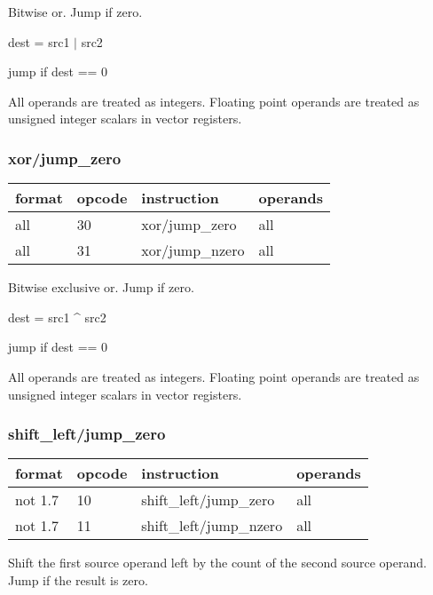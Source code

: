 \documentclass[forwardcom.tex]{subfiles}
\begin{document}
Bitwise or. Jump if zero.
\vspace{2mm}

dest = src1 $|$ src2

jump if dest == 0
\vspace{2mm}

All operands are treated as integers. 
Floating point operands are treated as unsigned integer scalars in vector registers.
\vspace{2mm}

\subsubsection{xor/jump\_zero}
\label{table:xorJumpZeroInstruction}
\begin{tabular}{|p{16mm}|p{12mm}|p{60mm}|p{50mm}|}
\hline
\bfseries format & \bfseries opcode & \bfseries instruction & \bfseries operands \\ \hline
all & 30 & xor/jump\_zero & all \\ \hline
all & 31 & xor/jump\_nzero & all \\ \hline
\end{tabular}
\vspace{2mm}

Bitwise exclusive or. Jump if zero.
\vspace{2mm}

dest = src1 \^{ } src2

jump if dest == 0
\vspace{2mm}

All operands are treated as integers. 
Floating point operands are treated as unsigned integer scalars in vector registers.


\subsubsection{shift\_left/jump\_zero}
\label{table:shiftLeftJumpZeroInstruction}
\begin{tabular}{|p{16mm}|p{12mm}|p{60mm}|p{50mm}|}
\hline
\bfseries format & \bfseries opcode & \bfseries instruction & \bfseries operands \\ \hline
not 1.7 & 10 & shift\_left/jump\_zero & all \\ \hline
not 1.7 & 11 & shift\_left/jump\_nzero & all \\ \hline
\end{tabular}
\vspace{2mm}

Shift the first source operand left by the count of the second source operand. Jump if the result is zero.
\vspace{2mm}
\end{document}

